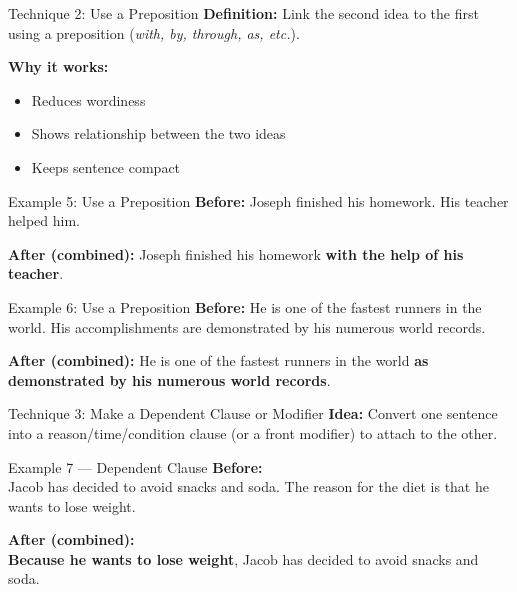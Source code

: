 \documentclass[aspectratio=169,11pt]{beamer}
\begin{document}
\begin{frame}{Technique 2: Use a Preposition}
\small
\textbf{Definition:} Link the second idea to the first using a preposition (\emph{with, by, through, as, etc.}).  

\textbf{Why it works:}
\begin{itemize}
  \item Reduces wordiness  
  \item Shows relationship between the two ideas  
  \item Keeps sentence compact
\end{itemize}
\end{frame}

\begin{frame}{Example 5: Use a Preposition}
\small
\textbf{Before:}  
Joseph finished his homework. His teacher helped him.  

\vspace{0.5em}
\textbf{After (combined):}  
Joseph finished his homework \textbf{with the help of his teacher}.
\end{frame}

\begin{frame}{Example 6: Use a Preposition}
\small
\textbf{Before:}  
He is one of the fastest runners in the world.  
His accomplishments are demonstrated by his numerous world records.  

\vspace{0.5em}
\textbf{After (combined):}  
He is one of the fastest runners in the world \textbf{as demonstrated by his numerous world records}.
\end{frame}

\begin{frame}{Technique 3: Make a Dependent Clause or Modifier}
\small
\textbf{Idea:} Convert one sentence into a reason/time/condition clause (or a front modifier) to attach to the other.
\end{frame}

\begin{frame}{Example 7 — Dependent Clause}
\small
\textbf{Before:}\\
Jacob has decided to avoid snacks and soda. The reason for the diet is that he wants to lose weight.

\vspace{0.5em}
\textbf{After (combined):}\\
\textbf{Because he wants to lose weight}, Jacob has decided to avoid snacks and soda.
\end{frame}
\end{document}
